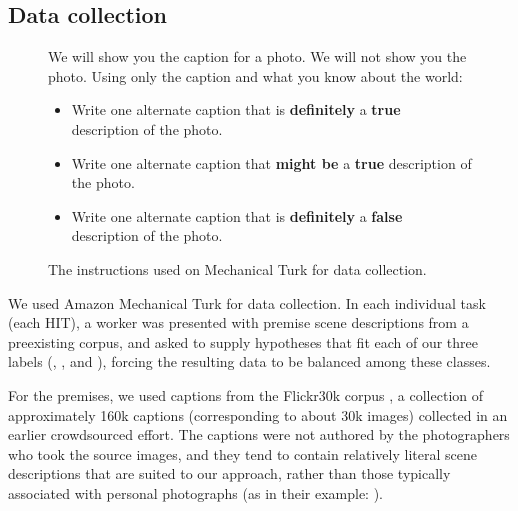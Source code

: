 \subsection{Data collection}

\begin{figure}
\begin{framed}
\small
We will show you the caption for a photo. We will not show you the photo. Using only the caption and what you know about the world:
\begin{itemize}
\item Write one alternate caption that is \textbf{definitely} a \textbf{true} description of the photo. 
\item Write one alternate caption that \textbf{might be} a \textbf{true} description of the photo. 
\item Write one alternate caption that is \textbf{definitely} a \textbf{false} description of the photo. 
\end{itemize}
\end{framed}

\caption{\label{instructions-1}The instructions used on Mechanical Turk for data collection.}
\end{figure}

We used Amazon Mechanical Turk for data collection. In each individual task (each HIT), a worker was presented with premise scene descriptions from a preexisting corpus, and asked to supply hypotheses that fit each of our three labels (, , and ), forcing the resulting data to be balanced among these classes.

For the premises, we used captions from the Flickr30k corpus \cite{hodoshimage}, a collection of approximately 160k captions (corresponding to about 30k images) collected in an earlier crowdsourced effort. The captions were not authored by the photographers who took the source images, and they tend to contain relatively literal scene descriptions that are suited to our approach, rather than those typically associated with personal photographs (as in their example: ).

